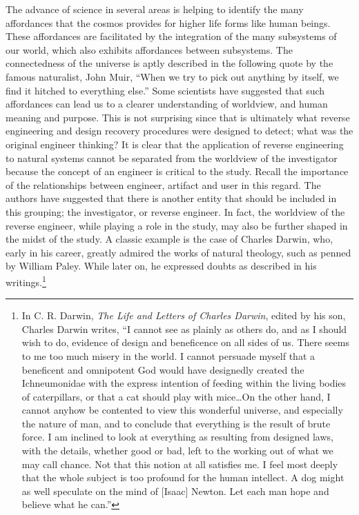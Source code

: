 The advance of science in several areas is helping to identify the many
affordances that the cosmos provides for higher life forms like human
beings.\citep{barrow2008} These affordances are facilitated by the
integration of the many subsystems of our world, which also exhibits
affordances between subsystems. The connectedness of the universe is
aptly described in the following quote by the famous naturalist, John
Muir, “When we try to pick out anything by itself, we find it hitched
to everything else.”\citep[][pg. 110]{muir1988} Some scientists have suggested
that such affordances can lead us to a clearer understanding of
worldview, and human meaning and purpose.\citep{denton1998} This is
not surprising since that is ultimately what reverse engineering and
design recovery procedures were designed to detect; what was the
original engineer thinking? It is clear that the application of reverse
engineering to natural systems cannot be separated from the worldview
of the investigator because the concept of an engineer is critical to
the study. Recall the importance of the relationships between engineer,
artifact and user in this regard. The authors have suggested that there
is another entity that should be included in this grouping; the
investigator, or reverse engineer. In fact, the worldview of the
reverse engineer, while playing a role in the study, may also be
further shaped in the midst of the study. A classic example is the case
of Charles Darwin, who, early in his career, greatly admired the works
of natural theology, such as penned by William Paley. While later on,
he expressed doubts as described in his writings.\footnote{
In C. R. Darwin, \textit{The Life and Letters of
Charles Darwin}, edited by his son, Charles Darwin writes, ``I cannot see as plainly as others do,
and as I should wish to do, evidence of design and beneficence on all
sides of us. There seems to me too much misery in the world.  I cannot
persuade myself that a beneficent and omnipotent God would have
designedly created the Ichneumonidae with the express intention of
feeding within the living bodies of caterpillars, or that a cat should
play with mice…On the other hand, I cannot anyhow be contented to view
this wonderful universe, and especially the nature of man, and to
conclude that everything is the result of brute force. I am inclined to
look at everything as resulting from designed laws, with the details,
whether good or bad, left to the working out of what we may call
chance. Not that this notion at all satisfies me. I feel most deeply
that the whole subject is too profound for the human intellect. A dog
might as well speculate on the mind of [Isaac] Newton. Let each man
hope and believe what he can.''\citep{darwinll}
}


